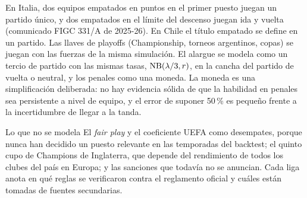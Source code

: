 En Italia, dos equipos empatados en puntos en el primer puesto juegan un partido único, y dos empatados en el límite del descenso juegan ida y vuelta (comunicado FIGC 331/A de 2025-26). En Chile el título empatado se define en un partido. Las llaves de playoffs (Championship, torneos argentinos, copas) se juegan con las fuerzas de la misma simulación. El alargue se modela como un tercio de partido con las mismas tasas, $\operatorname{NB}(\lambda/3,r)$, en la cancha del partido de vuelta o neutral, y los penales como una moneda. La moneda es una simplificación deliberada: no hay evidencia sólida de que la habilidad en penales sea persistente a nivel de equipo, y el error de suponer 50\,\% es pequeño frente a la incertidumbre de llegar a la tanda.

\begin{nota}{Lo que no se modela}
El \emph{fair play} y el coeficiente UEFA como desempates, porque nunca han decidido un puesto relevante en las temporadas del backtest; el quinto cupo de Champions de Inglaterra, que depende del rendimiento de todos los clubes del país en Europa; y las sanciones que todavía no se anuncian. Cada liga anota en  qué reglas se verificaron contra el reglamento oficial y cuáles están tomadas de fuentes secundarias.
\end{nota}

